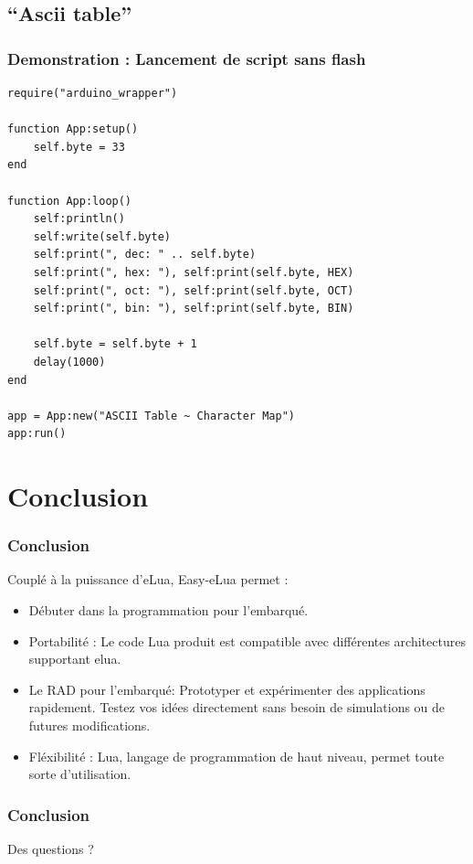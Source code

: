 \documentclass{beamer}
\begin{document}
\subsection{``Ascii table''}
\begin{frame}[containsverbatim]
\frametitle{Demonstration : Lancement de script sans flash}
\tiny{\begin{lstlisting}
require("arduino_wrapper")

function App:setup()
    self.byte = 33
end

function App:loop()
    self:println()
    self:write(self.byte)
    self:print(", dec: " .. self.byte)
    self:print(", hex: "), self:print(self.byte, HEX)
    self:print(", oct: "), self:print(self.byte, OCT)
    self:print(", bin: "), self:print(self.byte, BIN)

    self.byte = self.byte + 1
    delay(1000)
end

app = App:new("ASCII Table ~ Character Map")
app:run()

\end{lstlisting}}
\end{frame}

\section{Conclusion}
\begin{frame}
\frametitle{Conclusion}
Couplé à la puissance d'eLua, Easy-eLua permet :
\begin{itemize}
\item Débuter dans la programmation pour l'embarqué.
\item Portabilité : Le code Lua produit est compatible avec différentes architectures supportant elua.
\item Le RAD pour l'embarqué: Prototyper et expérimenter des applications rapidement. Testez vos idées directement sans besoin de simulations ou de futures modifications. 
\item Fléxibilité : Lua, langage de programmation de haut niveau, permet toute sorte d'utilisation.
\end{itemize}
\end{frame}

\begin{frame}
\frametitle{Conclusion}
\begin{center}
\huge{Des questions ?}
\end{center}
\end{frame}
\end{document}
